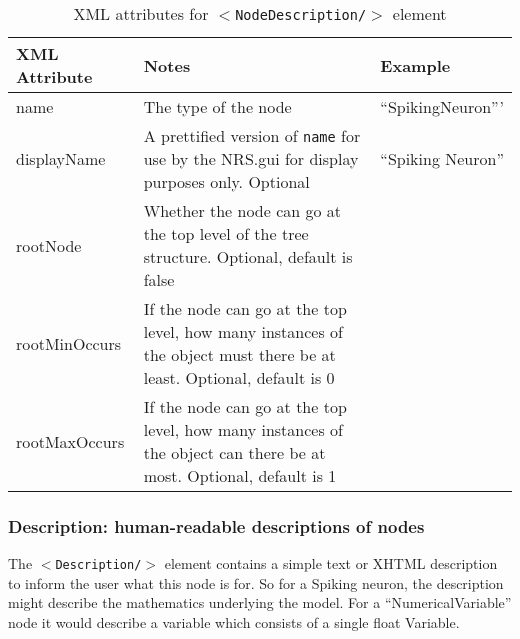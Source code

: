 \documentclass[pdftex,a4paper]{article}
\newcommand{\XML}[2][]{{\tt \small $<$#2#1/$>$}}
\newcommand{\XMLfont}[1]{{\tt \small #1}}
\begin{document}
\begin{table}[!h]
  \begin{center}
    \caption{XML attributes for \XML{NodeDescription} element}
    \label{tab:nd}
    \begin{tabular}{|l|p{6cm}|p{3cm}|}
      \hline

      \textbf{XML Attribute} & \textbf{Notes} & \textbf{Example}\\

      \hline

      name & The type of the node & ``SpikingNeuron'''\\

      \hline

      displayName & A prettified version of \XMLfont{name} for use by
      the NRS.gui for display purposes only. Optional & ``Spiking Neuron'' \\

      \hline

      rootNode & Whether the node can go at the top level of the tree
      structure. Optional, default is false &\\

      \hline

      rootMinOccurs & If the node can go at the top level, how many
      instances of the object must there be at least. Optional,
      default is 0 &\\

      \hline

      rootMaxOccurs & If the node can go at the top level, how many
      instances of the object can there be at most. Optional, default
      is 1 &\\

      \hline
    \end{tabular}
  \end{center}
\end{table}

\subsubsection{Description: human-readable descriptions of nodes}

The \XML{Description} element contains a simple text or XHTML
description to inform the user what this node is for. So for a Spiking
neuron, the description might describe the mathematics underlying the
model. For a ``NumericalVariable'' node it would describe a variable
which consists of a single float Variable.
\end{document}
